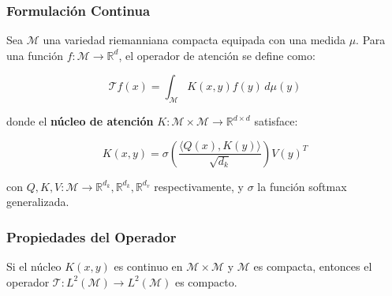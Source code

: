 \subsubsection{Formulación Continua}

Sea $\mathcal{M}$ una variedad riemanniana compacta equipada con una medida $\mu$. Para una función $f: \mathcal{M} \to \mathbb{R}^d$, el operador de atención se define como:

\begin{equation}
    \mathcal{T}f(x) = \int_{\mathcal{M}} K(x, y) f(y) \, d\mu(y)
    \label{eq:attention_integral_operator}
\end{equation}

donde el \textbf{núcleo de atención} $K: \mathcal{M} \times \mathcal{M} \to \mathbb{R}^{d \times d}$ satisface:

\begin{equation}
    K(x, y) = \sigma\left(\frac{\langle Q(x), K(y) \rangle}{\sqrt{d_k}}\right) V(y)^T
    \label{eq:attention_kernel}
\end{equation}

con $Q, K, V: \mathcal{M} \to \mathbb{R}^{d_k}, \mathbb{R}^{d_k}, \mathbb{R}^{d_v}$ respectivamente, y $\sigma$ la función softmax generalizada.

\subsubsection{Propiedades del Operador}

\begin{proposition}\label{prop:attention_compactness}
    Si el núcleo $K(x,y)$ es continuo en $\mathcal{M} \times \mathcal{M}$ y $\mathcal{M}$ es compacta, entonces el operador $\mathcal{T}: L^2(\mathcal{M}) \to L^2(\mathcal{M})$ es compacto.
\end{proposition}

